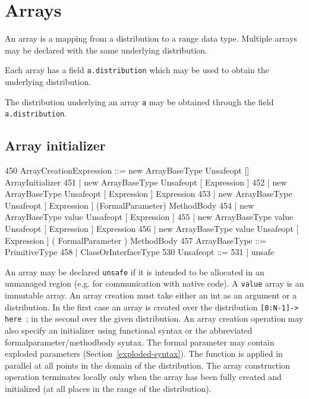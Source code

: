 \chapter{Arrays}\label{XtenArrays}

An array is a mapping from a distribution to a range data
type. Multiple arrays may be declared with the same underlying
distribution. 

Each array has a field {\tt a.distribution} which may be used to
obtain the underlying distribution.

The distribution underlying an array {\tt a} may be obtained through
the field {\tt a.distribution}.



\section{Array initializer}\label{ArrayInitializer}\label{array!creation}

\begin{x10}
450 ArrayCreationExpression ::= new ArrayBaseType Unsafeopt [] ArrayInitializer
451  | new ArrayBaseType Unsafeopt [ Expression ]
452  | new ArrayBaseType Unsafeopt [ Expression ] Expression
453  | new ArrayBaseType Unsafeopt [ Expression ] (FormalParameter) MethodBody
454  | new ArrayBaseType value Unsafeopt [ Expression ]
455  | new ArrayBaseType value Unsafeopt [ Expression ] Expression
456  | new ArrayBaseType value Unsafeopt [ Expression ] ( FormalParameter ) MethodBody
457   ArrayBaseType ::= PrimitiveType
458      | ClassOrInterfaceType
530   Unsafeopt ::=
531      | unsafe
\end{x10}

An array may be declared {\tt unsafe} if it is intended to be
allocated in an unmanaged region (e.g.{} for communication with native
code). A {\tt value} array is an immutable array. An array creation
must take either an int as an argument or a distribution. In the first
case an array is created over the distribution {\tt [0:N-1]-> here };
in the second over the given distribution. An array creation operation
may also specify an initializer using functional syntax or the
abbreviated formalparameter/methodbody syntax. The formal parameter
may contain exploded parameters
(Section~\ref{exploded-syntax}). The function is applied in
parallel at all points in the domain of the distribution. The array
construction operation terminates locally only when the array has been
fully created and initialized (at all places in the range of the
distribution).

